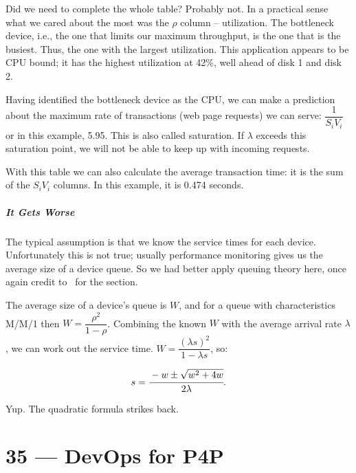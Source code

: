 \documentclass[a4paper]{report}
\begin{document}
Did we need to complete the whole table? Probably not. In a practical sense what we cared about the most was the $\rho$ column -- utilization. The bottleneck device, i.e., the one that limits our maximum throughput, is the one that is the busiest. Thus, the one with the largest utilization. This application appears to be CPU bound; it has the highest utilization at 42\%, well ahead of disk 1 and disk 2. 

Having identified the bottleneck device as the CPU, we can make a prediction about the maximum rate of transactions (web page requests) we can serve: $\dfrac{1}{S_{i}V_{i}}$ or in this example, 5.95. This is also called saturation. If $\lambda$ exceeds this saturation point, we will not be able to keep up with incoming requests.

With this table we can also calculate the average transaction time: it is the sum of the $S_{i}V_{i}$ columns. In this example, it is 0.474 seconds. 

\paragraph*{It Gets Worse}

The typical assumption is that we know the service times for each device. Unfortunately this is not true; usually performance monitoring gives us the average size of a device queue. So we had better apply queuing theory here, once again credit to~\cite{williams-calc} for the section. 

The average size of a device's queue is $W$, and for a queue with characteristics M/M/1 then $W = \dfrac{\rho^{2}}{1-\rho}$. Combining the known $W$ with the average arrival rate $\lambda$, we can work out the service time. $W = \dfrac{(\lambda s)^{2}}{1 - \lambda s}$, so:

\[ s = \cfrac{-w \pm \sqrt{w^{2}+4w}}{2\lambda}.\]

Yup. The quadratic formula strikes back. 









\chapter*{35 --- DevOps for P4P}

\end{document}

